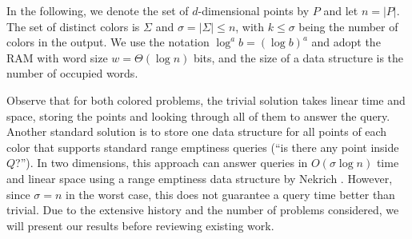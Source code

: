 In the following, we denote the set of $d$-dimensional points by $P$ and let $n = |P|$. The set of distinct colors is $\Sigma$ and  $\sigma = |\Sigma| \leq n$, with $k \leq \sigma$ being the number of colors in the output. We use the notation $\log^a b = (\log b)^a$ and adopt the RAM with word size $w = \Theta(\log n)$ bits, and the size of a data structure is the number of occupied words. 

Observe that for both colored problems, the trivial solution takes linear time and space, storing the points and looking through all of them  to answer the query. Another standard solution is to store one data structure for all points of each color that supports standard range emptiness queries (``is there any point inside $Q$?''). In two dimensions, this approach can answer queries in $O(\sigma \log n)$ time and linear space using a range emptiness data structure by Nekrich \cite{nekrich2009orthogonal}.
However, since $\sigma = n$ in the worst case, this does not guarantee a query time better than trivial. 
Due to the extensive history and the number of problems considered, we will present our results before reviewing existing work.
%

